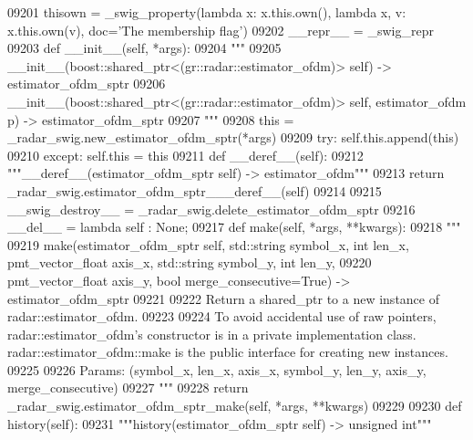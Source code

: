 \begin{DoxyCode}
{{{{{{{{{{{{{{{{{{{{{{{{{{{{{{09201     thisown = _swig_property(\textcolor{keyword}{lambda} x: x.this.own(), \textcolor{keyword}{lambda} x, v: x.this.own(v), doc=\textcolor{stringliteral}{'The membership flag'})
09202     \_\_repr\_\_ = \_swig\_repr
09203     \textcolor{keyword}{def }__init__(self, *args): 
09204         \textcolor{stringliteral}{"""}
09205 \textcolor{stringliteral}{        \_\_init\_\_(boost::shared\_ptr<(gr::radar::estimator\_ofdm)> self) -> estimator\_ofdm\_sptr}
09206 \textcolor{stringliteral}{        \_\_init\_\_(boost::shared\_ptr<(gr::radar::estimator\_ofdm)> self, estimator\_ofdm p) ->
       estimator\_ofdm\_sptr}
09207 \textcolor{stringliteral}{        """}
09208         this = \_radar\_swig.new\_estimator\_ofdm\_sptr(*args)
09209         \textcolor{keywordflow}{try}: self.this.append(this)
09210         \textcolor{keywordflow}{except}: self.this = this
09211     \textcolor{keyword}{def }__deref__(self):
09212         \textcolor{stringliteral}{"""\_\_deref\_\_(estimator\_ofdm\_sptr self) -> estimator\_ofdm"""}
09213         \textcolor{keywordflow}{return} \_radar\_swig.estimator\_ofdm\_sptr\_\_\_deref\_\_(self)
09214 
09215     \_\_swig\_destroy\_\_ = \_radar\_swig.delete\_estimator\_ofdm\_sptr
09216     \_\_del\_\_ = \textcolor{keyword}{lambda} self : \textcolor{keywordtype}{None};
09217     \textcolor{keyword}{def }make(self, *args, **kwargs):
09218         \textcolor{stringliteral}{"""}
09219 \textcolor{stringliteral}{        make(estimator\_ofdm\_sptr self, std::string symbol\_x, int len\_x, pmt\_vector\_float axis\_x,
       std::string symbol\_y, int len\_y, }
09220 \textcolor{stringliteral}{            pmt\_vector\_float axis\_y, bool merge\_consecutive=True) -> estimator\_ofdm\_sptr}
09221 \textcolor{stringliteral}{}
09222 \textcolor{stringliteral}{        Return a shared\_ptr to a new instance of radar::estimator\_ofdm.}
09223 \textcolor{stringliteral}{}
09224 \textcolor{stringliteral}{        To avoid accidental use of raw pointers, radar::estimator\_ofdm's constructor is in a private
       implementation class. radar::estimator\_ofdm::make is the public interface for creating new instances.}
09225 \textcolor{stringliteral}{}
09226 \textcolor{stringliteral}{        Params: (symbol\_x, len\_x, axis\_x, symbol\_y, len\_y, axis\_y, merge\_consecutive)}
09227 \textcolor{stringliteral}{        """}
09228         \textcolor{keywordflow}{return} \_radar\_swig.estimator\_ofdm\_sptr\_make(self, *args, **kwargs)
09229 
09230     \textcolor{keyword}{def }history(self):
09231         \textcolor{stringliteral}{"""history(estimator\_ofdm\_sptr self) -> unsigned int"""}
}}}}}}}}}}}}}}}}}}}}}}}}}}}}}}
\end{DoxyCode}
